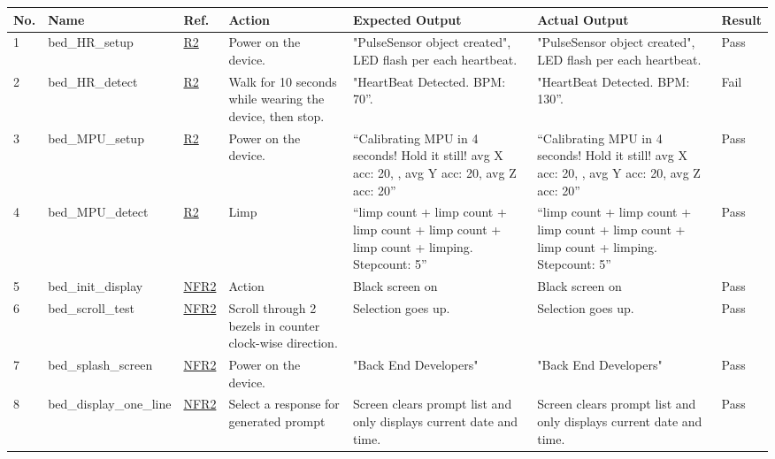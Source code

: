 \documentclass[12pt, titlepage]{article}
\begin{document}
\begin{center}
\begin{table} [H]
\begin{tabular}{ | p{0.5cm} | p{2.8cm} |  p{1.1cm} | p{2.7cm} | p{2.7cm} | p{2.7cm} | p{1.1cm} |}
\hline
\textbf{No.} & \textbf{Name}  & \textbf{Ref.} & \textbf{Action} & \textbf{Expected Output} & \textbf{Actual Output} & \textbf{Result} \\
\hline
 1 & bed\_HR\_setup & \href{https://github.com/zakerl/Capstone_Project/blob/main/docs/SRS/SRS.pdf}{R2} & Power on the device. & "PulseSensor object created", LED flash per each heartbeat. & "PulseSensor object created", LED flash per each heartbeat. & Pass \\ 
\hline
2 & bed\_HR\_detect & \href{https://github.com/zakerl/Capstone_Project/blob/main/docs/SRS/SRS.pdf}{R2} & Walk for 10 seconds while wearing the device, then stop. & "HeartBeat Detected. BPM: 70”. & "HeartBeat Detected. BPM: 130”. & Fail \\  
\hline
3 & bed\_MPU\newline \_setup & \href{https://github.com/zakerl/Capstone_Project/blob/main/docs/SRS/SRS.pdf}{R2} & Power on the device. & “Calibrating MPU in 4 seconds! Hold it still! avg X acc: 20, , avg Y acc: 20, avg Z acc: 20” & “Calibrating MPU in 4 seconds! Hold it still! avg X acc: 20, , avg Y acc: 20, avg Z acc: 20” & Pass \\  
\hline
4 & bed\_MPU\newline \_detect & \href{https://github.com/zakerl/Capstone_Project/blob/main/docs/SRS/SRS.pdf}{R2} & Limp & “limp count + limp count + limp count + limp count + limp count + limping. Stepcount: 5” & “limp count + limp count + limp count + limp count + limp count + limping. Stepcount: 5” & Pass \\ 
\hline
5 & bed\_init\_display & \href{https://github.com/zakerl/Capstone_Project/blob/main/docs/SRS/SRS.pdf}{NFR2} & Action & Black screen on & Black screen on & Pass \\ 
\hline
6 & bed\_scroll\_test &  \href{https://github.com/zakerl/Capstone_Project/blob/main/docs/SRS/SRS.pdf}{NFR2} & Scroll through 2 bezels in counter clock-wise direction. & Selection goes up. & Selection goes up. & Pass \\ 
\hline
7 & bed\_splash\newline \_screen & \href{https://github.com/zakerl/Capstone_Project/blob/main/docs/SRS/SRS.pdf}{NFR2} & Power on the device. & "Back End Developers" & "Back End Developers" & Pass \\ 
\hline
8 & bed\_display\newline \_one\_line & \href{https://github.com/zakerl/Capstone_Project/blob/main/docs/SRS/SRS.pdf}{NFR2} & Select a response for generated prompt & Screen clears prompt list and only displays current date and time. & Screen clears prompt list and only displays current date and time. & Pass \\ 
\hline
\end{tabular}
\end{table}
\end{center}
\end{document}
